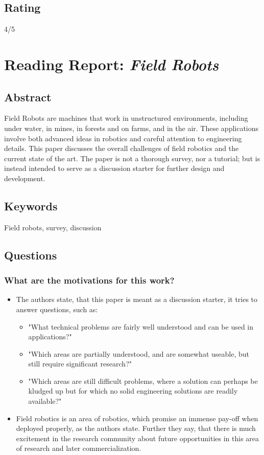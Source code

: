 \subsection*{Rating}
4/5

\section{Reading Report: \emph{Field Robots}}
\cite{Thorpe2001}

\subsection*{Abstract}
Field Robots are machines that work in unstructured environments, including
under water, in mines, in forests and on farms, and in the air. These applications
involve both advanced ideas in robotics and careful attention to engineering
details. This paper discusses the overall challenges of field robotics and the
current state of the art. The paper is not a thorough survey, nor a tutorial; but is
instead intended to serve as a discussion starter for further design and
development.

\subsection*{Keywords}
Field robots, survey, discussion

\subsection*{Questions}
\subsubsection*{What are the motivations for this work?}
\begin{itemize}
    \item The authors state, that this paper is meant as a discussion starter, it tries to answer questions, such as: \ \begin{itemize}
        \item "What technical problems are fairly well understood and can be used in applications?"
        \item "Which areas are partially understood, and are somewhat useable, but still require significant research?"
        \item "Which areas are still difficult problems, where a solution can perhaps be kludged up but for which no solid engineering solutions are readily available?"
    \end{itemize}
    \item Field robotics is an area of robotics, which promise an immense pay-off when deployed properly, as the authors state. Further they say, that there is much excitement in the research community about future opportunities in this area of research and later commercialization.
\end{itemize}
